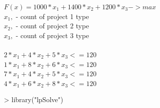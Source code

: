 \documentclass[a4paper,11pt]{scrartcl}
\begin{document}
\bigskip
\begin{math} F(x)  = 1000*x_1 +1400 *x_2 +1200*x_3 -> max  \end{math}\\
\begin{math}x_1, \end{math} - count of project 1 type  \\  
\begin{math}x_2, \end{math} - count of project 2 type  \\
\begin{math}x_3, \end{math} - count of project 3 type  \\ 
\\
\begin{math} 2*x_1 + 4*x_2+5*x_3 <=120 \end{math}\\
\begin{math} 1*x_1 + 8*x_2+6*x_3 <=120 \end{math}\\
\begin{math} 7*x_1 + 4*x_2+5*x_3 <=120 \end{math}\\
\begin{math} 4*x_1 + 6*x_2+8*x_3 <=120 \end{math}\\
\begin{Schunk}
\begin{Sinput}
> library("lpSolve")
\end{Sinput}
\end{Schunk}
\end{document}
